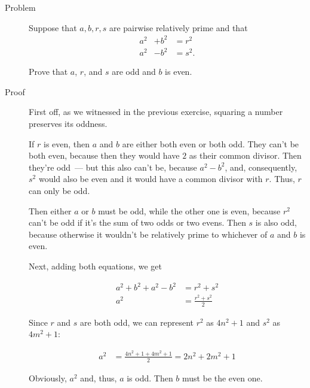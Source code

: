 \begin{description}
\item[Problem] Suppose that $a, b, r, s$ are pairwise relatively prime and that
\begin{align*}
a^2 &+ b^2 &= r^2 \\
a^2 &- b^2 &= s^2.
\end{align*}

Prove that $a$, $r$, and $s$ are odd and $b$ is even.

\item[Proof]

First off, as we witnessed in the previous exercise, squaring a number
preserves its oddness.

If $r$ is even, then $a$ and $b$ are either both even or both odd. They can't
be both even, because then they would have $2$ as their common divisor. Then
they're odd~--- but this also can't be, because $a^2 - b^2$, and, consequently,
$s^2$ would also be even and it would have a common divisor with $r$. Thus, $r$
can only be odd.

Then either $a$ or $b$ must be odd, while the other one is even, because $r^2$
can't be odd if it's the sum of two odds or two evens. Then $s$ is also odd,
because otherwise it wouldn't be relatively prime to whichever of $a$ and $b$
is even.

Next, adding both equations, we get 

\begin{align*}
a^2 + b^2 + a^2 - b^2 &= r^2 + s^2 \\
a^2 &= \frac{r^2 + s^2} 2
\end{align*}

Since $r$ and $s$ are both odd, we can represent $r^2$ as $4n^2 + 1$ and $s^2$
as $4m^2 + 1$:

\begin{align*}
a^2 &= \frac{4n^2 + 1 + 4m^2 + 1} 2 = 2n^2 + 2m^2 + 1
\end{align*}

Obviously, $a^2$ and, thus, $a$ is odd. Then $b$ must be the even one.

\end{description}
